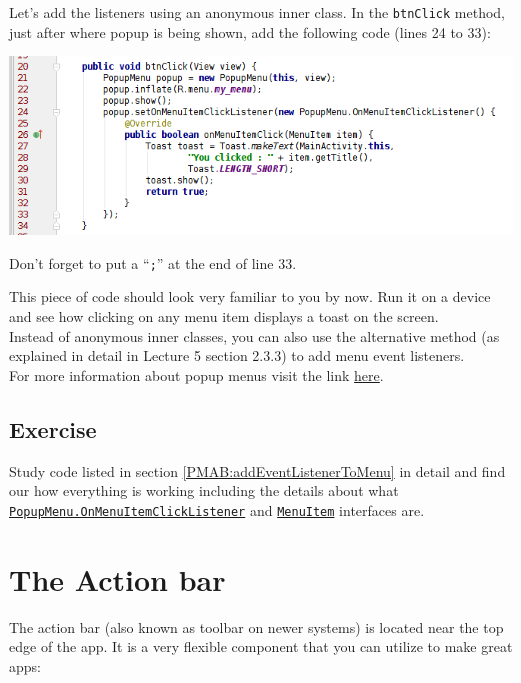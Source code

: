 Let's add the listeners using an anonymous inner class. In the \texttt{btnClick} method, just after where popup is being shown, add the following code (lines 24 to 33):

\begin{center}
	\includegraphics[scale=0.4]{chapters/ch07/images/43}
\end{center}

Don't forget to put a ``\texttt{;}'' at the end of line 33.

This piece of code should look very familiar to you by now. Run it on a device and see how clicking on any menu item displays a toast on the screen. \\

Instead of anonymous inner classes, you can also use the alternative method (as explained in detail in Lecture 5 section 2.3.3) to add menu event listeners. \\

For more information about popup menus visit the link \href{https://developer.android.com/reference/android/widget/PopupMenu.html}{here}.

\subsection{Exercise}
Study code listed in section \ref{PMAB:addEventListenerToMenu} in detail and find our how everything is working including the details about what \href{https://developer.android.com/reference/android/widget/PopupMenu.OnMenuItemClickListener.html}{\texttt{PopupMenu.OnMenuItemClickListener}} and \href{https://developer.android.com/reference/android/view/MenuItem.html}{\texttt{MenuItem}} interfaces are.



\section{The Action bar}
The action bar (also known as toolbar on newer systems) is located near the top edge of the app. It is a very flexible component that you can utilize to make great apps:


